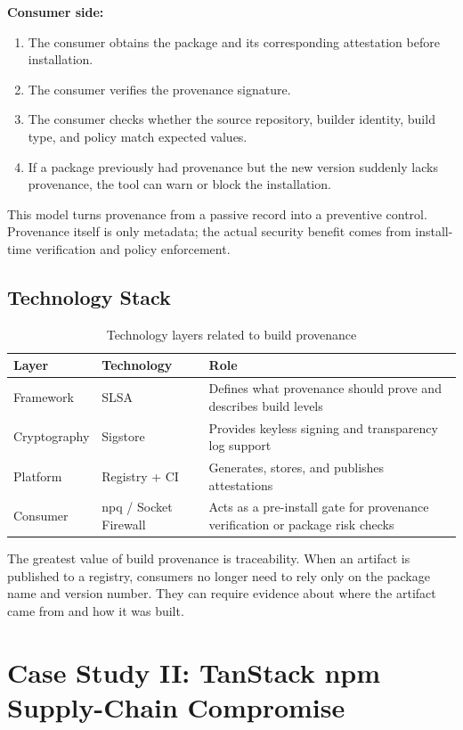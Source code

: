 \documentclass[12pt,a4paper]{article}
\begin{document}
\textbf{Consumer side:}

\begin{enumerate}[label=(\arabic*)]
  \item The consumer obtains the package and its corresponding attestation before installation.
  \item The consumer verifies the provenance signature.
  \item The consumer checks whether the source repository, builder identity, build type, and policy match expected values.
  \item If a package previously had provenance but the new version suddenly lacks provenance, the tool can warn or block the installation.
\end{enumerate}

This model turns provenance from a passive record into a preventive control. Provenance itself is only metadata; the actual security benefit comes from install-time verification and policy enforcement.

\subsection{Technology Stack}

\begin{table}[h]
\centering
\caption{Technology layers related to build provenance}
\begin{tabularx}{\textwidth}{P{3cm}P{4cm}Y}
\toprule
\textbf{Layer} & \textbf{Technology} & \textbf{Role} \\
\midrule
Framework & SLSA & Defines what provenance should prove and describes build levels \\
Cryptography & Sigstore & Provides keyless signing and transparency log support \\
Platform & Registry + CI & Generates, stores, and publishes attestations \\
Consumer & npq / Socket Firewall & Acts as a pre-install gate for provenance verification or package risk checks \\
\bottomrule
\end{tabularx}
\end{table}

The greatest value of build provenance is traceability. When an artifact is published to a registry, consumers no longer need to rely only on the package name and version number. They can require evidence about where the artifact came from and how it was built.

\section{Case Study II: TanStack npm Supply-Chain Compromise}
\end{document}
